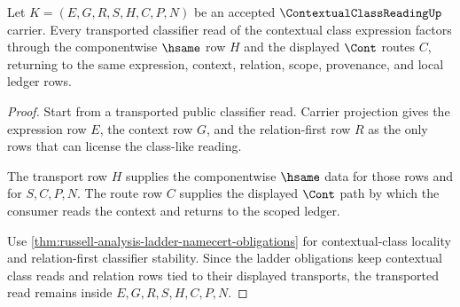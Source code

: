 \begin{theorem}
\label{thm:contextual-class-reading-classifier-transport}
Let $K=(E,G,R,S,H,C,P,N)$ be an accepted $\ContextualClassReadingUp$ carrier. Every transported classifier read of the contextual class expression factors through the componentwise $\hsame$ row $H$ and the displayed $\Cont$ routes $C$, returning to the same expression, context, relation, scope, provenance, and local ledger rows.
\end{theorem}
\begin{proof}
Start from a transported public classifier read. Carrier projection gives the expression row $E$, the context row $G$, and the relation-first row $R$ as the only rows that can license the class-like reading.

The transport row $H$ supplies the componentwise $\hsame$ data for those rows and for $S,C,P,N$. The route row $C$ supplies the displayed $\Cont$ path by which the consumer reads the context and returns to the scoped ledger.

Use \autoref{thm:russell-analysis-ladder-namecert-obligations} for contextual-class locality and relation-first classifier stability. Since the ladder obligations keep contextual class reads and relation rows tied to their displayed transports, the transported read remains inside $E,G,R,S,H,C,P,N$.
\end{proof}

